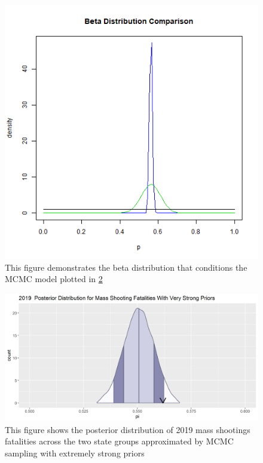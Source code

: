\documentclass{article}
\begin{document}
\begin{figure}[!h]
    \centering
    \includegraphics[scale=.4]{Figure4.png}
    \caption{This figure demonstrates the beta distribution that conditions the MCMC model plotted in \ref{fig:5}}
    \label{fig:4}
\end{figure}


\begin{figure}[!h]
    \centering
    \includegraphics[scale=.5]{Figure5.png}
    \caption{This figure shows the posterior distribution of 2019 mass shootings fatalities across the two state groups approximated by MCMC sampling with extremely strong priors}
    \label{fig:5}
\end{figure}
\end{document}
